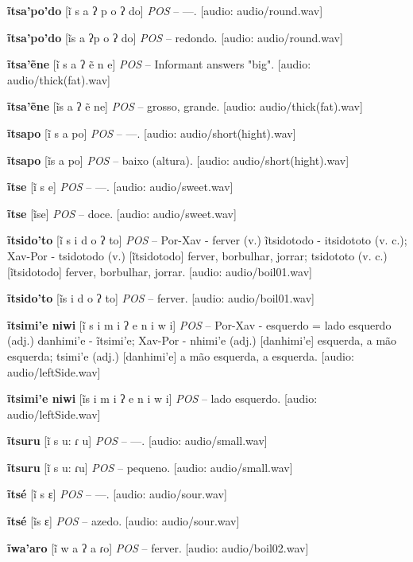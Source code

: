 \textbf{ĩtsa'po'do} [ĩ s a ʔ p o ʔ do] \textit{POS} -- —. [audio: audio/round.wav]{\faHeadphones}

\textbf{ĩtsa'po'do} [ĩs a ʔp o ʔ do] \textit{POS} -- redondo. [audio: audio/round.wav]{\faHeadphones}

\textbf{ĩtsa'ẽne} [ĩ s a ʔ ẽ n e] \textit{POS} -- Informant answers "big". [audio: audio/thick(fat).wav]{\faHeadphones}

\textbf{ĩtsa'ẽne} [ĩs a ʔ ẽ ne] \textit{POS} -- grosso, grande. [audio: audio/thick(fat).wav]{\faHeadphones}

\textbf{ĩtsapo} [ĩ s a po] \textit{POS} -- —. [audio: audio/short(hight).wav]{\faHeadphones}

\textbf{ĩtsapo} [ĩs a po] \textit{POS} -- baixo (altura). [audio: audio/short(hight).wav]{\faHeadphones}

\textbf{ĩtse} [ĩ s e] \textit{POS} -- —. [audio: audio/sweet.wav]{\faHeadphones}

\textbf{ĩtse} [ĩse] \textit{POS} -- doce. [audio: audio/sweet.wav]{\faHeadphones}

\textbf{ĩtsido'to} [ĩ s i d o ʔ to] \textit{POS} -- Por-Xav - ferver (v.) ĩtsidotodo - itsidototo (v. c.); Xav-Por - tsidotodo (v.) [ĩtsidotodo] ferver, borbulhar, jorrar; tsidototo (v. c.) [ĩtsidotodo] ferver, borbulhar, jorrar. [audio: audio/boil01.wav]{\faHeadphones}

\textbf{ĩtsido'to} [ĩs i d o ʔ to] \textit{POS} -- ferver. [audio: audio/boil01.wav]{\faHeadphones}

\textbf{ĩtsimi'e niwi} [ĩ s i m i ʔ e n i w i] \textit{POS} -- Por-Xav - esquerdo = lado esquerdo (adj.) danhimi'e - ĩtsimi'e; Xav-Por - nhimi'e (adj.) [danhimi'e] esquerda, a mão esquerda; tsimi'e (adj.) [danhimi'e] a mão esquerda, a esquerda. [audio: audio/leftSide.wav]{\faHeadphones}

\textbf{ĩtsimi'e niwi} [ĩs i m i ʔ e n i w i] \textit{POS} -- lado esquerdo. [audio: audio/leftSide.wav]{\faHeadphones}

\textbf{ĩtsuru} [ĩ s u: ɾ u] \textit{POS} -- —. [audio: audio/small.wav]{\faHeadphones}

\textbf{ĩtsuru} [ĩ s u: ɾu] \textit{POS} -- pequeno. [audio: audio/small.wav]{\faHeadphones}

\textbf{ĩtsé} [ĩ s ɛ] \textit{POS} -- —. [audio: audio/sour.wav]{\faHeadphones}

\textbf{ĩtsé} [ĩs ɛ] \textit{POS} -- azedo. [audio: audio/sour.wav]{\faHeadphones}

\textbf{ĩwa'aro} [ĩ w a ʔ a ɾo] \textit{POS} -- ferver. [audio: audio/boil02.wav]{\faHeadphones}

